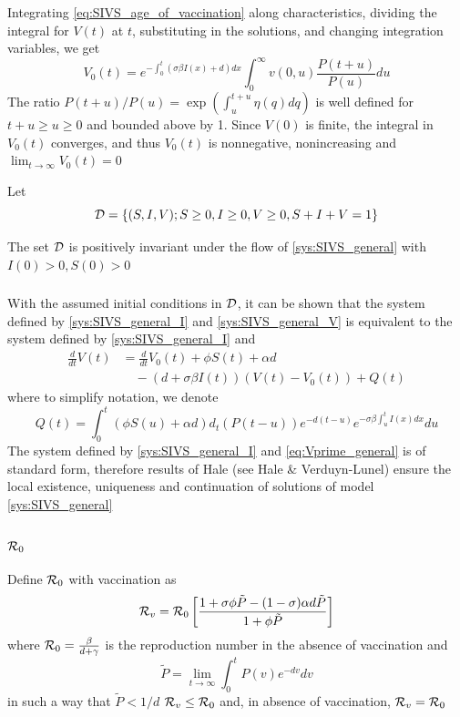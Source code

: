 \documentclass[aspectratio=169]{beamer}\usepackage[]{graphicx}\usepackage[]{xcolor}
\begin{document}
\begin{frame}
Integrating \eqref{eq:SIVS_age_of_vaccination} along characteristics, dividing the integral for $V(t)$ at $t$, substituting in the solutions, and changing integration variables, we get
\begin{equation}
V_0(t)=e^{-\int_0^t(\sigma\beta I(x)+d)dx} \int_0^\infty
v(0,u)\frac{P(t+u)}{P(u)}du 
\label{eq:V0}
\end{equation}
The ratio $P(t+u)/P(u)=\exp\left(\int_u^{t+u}\eta(q)dq\right)$ is well defined for $t+u\geq u\geq 0$ and bounded above by 1. 
\vfill
Since $V(0)$ is finite, the integral in $V_0(t)$ converges, and thus $V_0(t)$ is nonnegative,
nonincreasing and $\lim_{t\to\infty}V_0(t)=0$
\end{frame}

\begin{frame}
Let
\[
\mathcal{D}=\{
(S,I,V); S\geq 0, I\geq 0, V\geq 0, S+I+V=1
\}
\]
\vfill
\begin{theorem}
The set $\mathcal{D}$ is positively invariant under the flow of \eqref{sys:SIVS_general} with $I(0)>0, S(0)>0$
\label{th:invariance_gen_model}
\end{theorem}
\end{frame}


\begin{frame}\frametitle{}
With the assumed initial conditions in $\mathcal{D}$, it can be shown that the system defined by \eqref{sys:SIVS_general_I} and \eqref{sys:SIVS_general_V} is equivalent to the system defined by \eqref{sys:SIVS_general_I} and
\begin{align}
\frac{d}{dt}V(t) &= \frac{d}{dt}V_0(t)+\phi S(t)+\alpha d \label{eq:Vprime_general} \\
&\quad -(d+\sigma\beta I(t))(V(t)-V_0(t)) 
+ Q(t)\nonumber
\end{align}
where to simplify notation, we denote
\[
Q(t)=\int_0^t (\phi S(u)+\alpha d) d_t(P(t-u))e^{-d(t-u)}
e^{-\sigma\beta\int_u^t I(x)dx}du
\]
\vfill
The system defined by \eqref{sys:SIVS_general_I} and \eqref{eq:Vprime_general} is of standard form, therefore results of Hale (see Hale \& Verduyn-Lunel) ensure the local existence, uniqueness and continuation of solutions of model \eqref{sys:SIVS_general}
\end{frame}

\begin{frame}\frametitle{$\mathcal{R}_0$}
Define $\mathcal{R}_0$ with vaccination as
\begin{equation}
\mathcal{R}_v=\mathcal{R}_0\left[
\frac{1+\sigma\phi\tilde P-(1-\sigma)\alpha d\tilde P}
{1+\phi\tilde P}
\right]
\label{eq:generalRphi}
\end{equation}
where $\mathcal{R}_0=\frac{\beta}{d+\gamma}$ is the reproduction number in the absence of vaccination and 
\[
\tilde P=\lim_{t\to\infty}\int_0^t P(v)e^{-dv}dv
\]
in such a way that $\tilde P<1/d$
\vfill
\bbullet
$\mathcal{R}_v\leq \mathcal{R}_0$ and, in absence of vaccination,
$\mathcal{R}_v=\mathcal{R}_0$
\end{frame}
\end{document}
